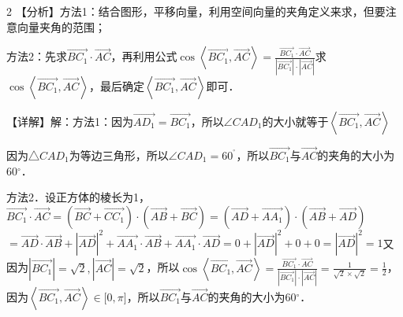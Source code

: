 \begin{multicols}{2}
\bindp 【分析】方法1：结合图形，平移向量，利用空间向量的夹角定义来求，但要注意向量夹角的范围；

\bindp 方法2：先求\(\overrightarrow{BC_{1}} \cdot \overrightarrow{AC}\)，再利用公式\(\cos\left\langle \overrightarrow{BC_{1}},\overrightarrow{AC} \right\rangle = \frac{\overrightarrow{BC_{1}} \cdot \overrightarrow{AC}}{\left| \overrightarrow{BC_{1}} \right| \cdot \allowbreak\left| \overrightarrow{AC} \right|}\)求\(\cos\left\langle \overrightarrow{BC_{1}},\overrightarrow{AC} \right\rangle\)，最后确定\(\left\langle \overrightarrow{BC_{1}},\overrightarrow{AC} \right\rangle\)即可．

\bindp 【详解】解：方法1：因为\(\overrightarrow{AD_{1}} = \overrightarrow{BC_{1}}\)，所以\(\angle CAD_{1}\)的大小就等于\(\left\langle \overrightarrow{BC_{1}},\overrightarrow{AC} \right\rangle\)

\bindp 因为△\(CAD_{1}\)为等边三角形，所以\(\angle CAD_{1} = 60^{{^\circ}}\)，所以\(\overrightarrow{BC_{1}}\)与\(\overrightarrow{AC}\)的夹角的大小为\(60{^\circ}\)．

\bindp 方法2．设正方体的棱长为1，\(\overrightarrow{BC_{1}} \cdot \overrightarrow{AC} = \allowbreak\left( \overrightarrow{BC} + \overrightarrow{CC_{1}} \right) \cdot \allowbreak\left( \overrightarrow{AB} + \overrightarrow{BC} \right) = \allowbreak\left( \overrightarrow{AD} + \overrightarrow{AA_{1}} \right) \cdot \allowbreak\left( \overrightarrow{AB} + \overrightarrow{AD} \right)\)\(= \overrightarrow{AD} \cdot \overrightarrow{AB} + \left| \overrightarrow{AD} \right|^{2} + \overrightarrow{AA_{1}} \cdot \overrightarrow{AB} + \overrightarrow{AA_{1}} \cdot \overrightarrow{AD} = 0 + \left| \overrightarrow{AD} \right|^{2} + 0 + 0 = \allowbreak\left| \overrightarrow{AD} \right|^{2} = 1\)又因为\(\left| \overrightarrow{BC_{1}} \right| = \sqrt{2},\left| \overrightarrow{AC} \right| = \sqrt{2}\)，所以\(\cos\left\langle \overrightarrow{BC_{1}},\overrightarrow{AC} \right\rangle = \frac{\overrightarrow{BC_{1}} \cdot \overrightarrow{AC}}{\left| \overrightarrow{BC_{1}} \right| \cdot \allowbreak\left| \overrightarrow{AC} \right|} = \frac{1}{\sqrt{2} \times \sqrt{2}} = \frac{1}{2}\)，
因为\(\left\langle \overrightarrow{BC_{1}},\overrightarrow{AC} \right\rangle \in \lbrack 0,\pi\rbrack\)，所以\(\overrightarrow{BC_{1}}\)与\(\overrightarrow{AC}\)的夹角的大小为\(60{^\circ}\)．



\end{multicols}
